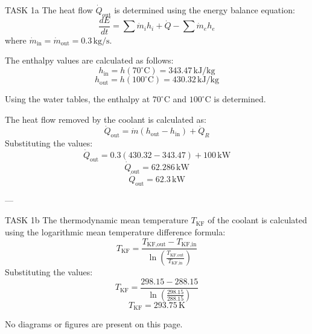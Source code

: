 TASK 1a  
The heat flow \( \dot{Q}_{\text{out}} \) is determined using the energy balance equation:  
\[
\frac{dE}{dt} = \sum \dot{m}_i h_i + \dot{Q} - \sum \dot{m}_e h_e
\]  
where \( \dot{m}_{\text{in}} = \dot{m}_{\text{out}} = 0.3 \, \text{kg/s} \).  

The enthalpy values are calculated as follows:  
\[
h_{\text{in}} = h(70^\circ\text{C}) = 343.47 \, \text{kJ/kg}
\]  
\[
h_{\text{out}} = h(100^\circ\text{C}) = 430.32 \, \text{kJ/kg}
\]  

Using the water tables, the enthalpy at \( 70^\circ\text{C} \) and \( 100^\circ\text{C} \) is determined.  

The heat flow removed by the coolant is calculated as:  
\[
\dot{Q}_{\text{out}} = \dot{m}(h_{\text{out}} - h_{\text{in}}) + \dot{Q}_R
\]  
Substituting the values:  
\[
\dot{Q}_{\text{out}} = 0.3(430.32 - 343.47) + 100 \, \text{kW}
\]  
\[
\dot{Q}_{\text{out}} = 62.286 \, \text{kW}
\]  
\[
\dot{Q}_{\text{out}} = 62.3 \, \text{kW}
\]  

---

TASK 1b  
The thermodynamic mean temperature \( T_{\text{KF}} \) of the coolant is calculated using the logarithmic mean temperature difference formula:  
\[
T_{\text{KF}} = \frac{T_{\text{KF,out}} - T_{\text{KF,in}}}{\ln \left( \frac{T_{\text{KF,out}}}{T_{\text{KF,in}}} \right)}
\]  
Substituting the values:  
\[
T_{\text{KF}} = \frac{298.15 - 288.15}{\ln \left( \frac{298.15}{288.15} \right)}
\]  
\[
T_{\text{KF}} = 293.75 \, \text{K}
\]  

No diagrams or figures are present on this page.
